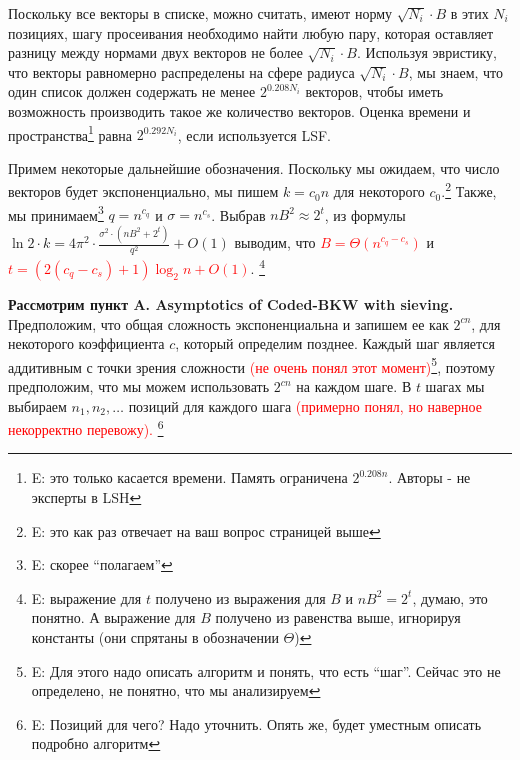 \documentclass[a4paper,11pt]{article}
\begin{document}
Поскольку все векторы в списке, можно считать, имеют норму $\sqrt{N_i}\cdot B$ в этих $N_i$ позициях, шагу просеивания необходимо найти любую пару, которая оставляет разницу между нормами двух векторов не более $\sqrt{N_i}\cdot B$. Используя эвристику, что векторы равномерно распределены на сфере радиуса $\sqrt{N_i}\cdot B$, мы знаем, что один список должен содержать не менее $2^{0.208N_i }$ векторов, чтобы иметь возможность производить такое же количество векторов. Оценка времени и пространства\footnote{E: это только касается времени. Память ограничена $2^{0.208n }$. Авторы - не эксперты в LSH} равна $2^{0.292N_i}$, если используется LSF.

Примем некоторые дальнейшие обозначения. Поскольку мы ожидаем, что число векторов будет экспоненциально, мы пишем $k=c_0n$ для некоторого $c_0$.\footnote{E: это как раз отвечает на ваш вопрос страницей выше} Также, мы принимаем\footnote{E: скорее ``полагаем''} $q=n^{c_q}$ и $\sigma=n^{c_s}$. Выбрав $nB^2\approx2^t$, из формулы $\ln{2} \cdot k = 4\pi^2 \cdot \frac{\sigma^2 \cdot (nB^2+2^t)}{q^2} + O(1)$ выводим, что \textcolor{red}{$B=\Theta(n^{c_q-c_s})$} и \textcolor{red}{$t=(2(c_q-c_s)+1)\log_2 n + O(1)$}. \footnote{E: выражение для $t$ получено из выражения для $B$ и $nB^2 = 2^t$, думаю, это понятно. А выражение для $B$ получено из равенства выше, игнорируя константы (они спрятаны в обозначении $\Theta$)}

\textbf{Рассмотрим пункт A. Asymptotics of Coded-BKW with sieving.}\\

Предположим, что общая сложность экспоненциальна и запишем ее как $2^{cn}$, для некоторого коэффициента $c$, который определим позднее. Каждый шаг является аддитивным с точки зрения сложности \textcolor{red}{(не очень понял этот момент)}\footnote{E: Для этого надо описать алгоритм и понять, что есть ``шаг''. Сейчас это не определено, не понятно, что мы анализируем}, поэтому предположим, что мы можем использовать $2^{cn}$ на каждом шаге. В $t$ шагах мы выбираем $n_1,n_2,…$ позиций для каждого шага  \textcolor{red}{(примерно понял, но наверное некорректно перевожу). \footnote{E: Позиций для чего? Надо уточнить. Опять же, будет уместным описать подробно алгоритм}}
\end{document}
